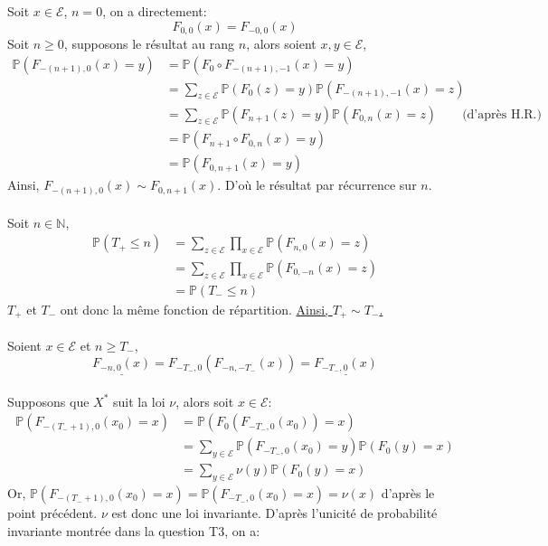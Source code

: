 \documentclass[a4paper,11pt]{article}
\def \P{\mathbb{P}}
\def \E{\mathcal{E}}
\begin{document}
Soit $x \in \E$, $n=0$, on a directement:
\[F_{0,0}(x)=F_{-0,0}(x)\]
Soit $n \geq 0$, supposons le résultat au rang $n$, alors soient $x,y \in \E$,
\begin{equation*}
\begin{split}
\P(F_{-(n+1),0}(x)=y)&=\P(F_0\circ F_{-(n+1),-1}(x)=y)\\
&=\sum_{z \in \E} \P(F_0(z)=y)\P(F_{-(n+1),-1}(x)=z)\\
&=\sum_{z \in \E} \P(F_{n+1}(z)=y)\P(F_{0,n}(x)=z) \quad\quad\text{(d'après H.R.)}\\
&=\P(F_{n+1}\circ F_{0,n}(x)=y)\\
&=\P(F_{0,n+1}(x)=y)
\end{split}
\end{equation*}
Ainsi, $F_{-(n+1),0}(x) \sim F_{0,n+1}(x)$.
D'où le résultat par récurrence sur $n$.\\
\\
Soit $n \in \mathbb{N}$,
\begin{equation*}
\begin{split}
\P(T_{+}\leq n)&=\sum_{z \in \E} \prod_{x \in \E} \P(F_{n,0}(x)=z)\\
&=\sum_{z \in \E} \prod_{x \in \E} \P(F_{0,-n}(x)=z)\\
&=\P(T_{-}\leq n)
\end{split}
\end{equation*}
$T_+$ et $T_-$ ont donc la même fonction de répartition.
\underline{Ainsi, $T_+ \sim T_-$.}\\
\\
Soient $x \in \E$ et $n \geq T_-$,
\[\underline{F_{-n,0}(x)}=F_{-T_-,0}(F_{-n,-T_-}(x))=\underline{F_{-T_-,0}(x)}\]\\
Supposons que $X^*$ suit la loi $\nu$, alors soit $x \in \E$:
\begin{equation*}
\begin{split}
\P(F_{-(T_- +1),0}(x_0)=x)&=\P(F_0(F_{-T_-,0}(x_0))=x)\\
&=\sum_{y \in \E}\P(F_{-T_-,0}(x_0)=y)\P(F_0(y)=x)\\
&=\sum_{y \in \E}\nu(y)\P(F_0(y)=x)
\end{split}
\end{equation*}
Or, $\P(F_{-(T_- +1),0}(x_0)=x)=\P(F_{-T_-,0}(x_0)=x)=\nu(x)$ d'après le point précédent.
$\nu$ est donc une loi invariante. D'après l'unicité de probabilité invariante montrée dans la question T3, on a:

\begin{center}
\end{center}
\end{document}
